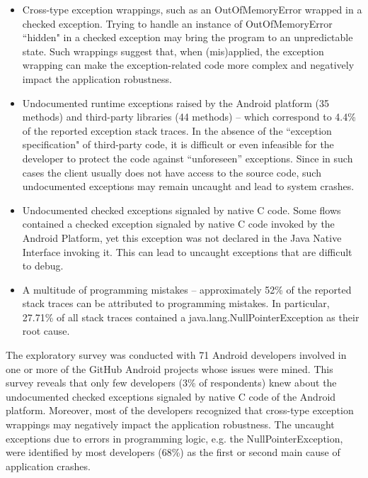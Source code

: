 \begin{itemize}

   \item  Cross-type exception wrappings, such as an OutOfMemoryError wrapped in a checked exception.
Trying to handle an instance of OutOfMemoryError ``hidden" in  a checked exception may bring the program
 to an unpredictable state. Such wrappings suggest that, when (mis)applied, the exception wrapping can make
the exception-related code more complex and negatively impact the application robustness.

  \item  Undocumented runtime exceptions raised by the Android platform (35 methods) and  third-party libraries (44 methods) --
 which correspond to 4.4\% of the reported exception stack traces.
In the absence of the ``exception specification" of third-party code, it is difficult or
even infeasible for the developer to protect the code against ``unforeseen'' exceptions.
Since in such cases the client usually does not have access to the source code, such undocumented
exceptions may remain uncaught and lead to system crashes.

   \item Undocumented checked exceptions signaled by native C code.  Some flows contained a checked
exception signaled by native C code invoked by the Android Platform, yet this exception was not declared
 in the Java Native Interface invoking it. This can lead to uncaught exceptions that are
difficult to debug.

 \item A multitude of programming mistakes -- approximately 52\% of the reported stack traces can
be attributed to programming mistakes. In particular, 27.71\% of all stack traces contained a java.lang.NullPointerException
as their root cause.

\end{itemize}

The exploratory survey was conducted with 71 Android developers involved in one or more of the
GitHub Android projects whose issues were mined. This survey reveals that only few developers (3\% of respondents)
 knew about the undocumented checked exceptions signaled by native C code of the Android platform.
Moreover, most of the developers recognized that cross-type exception wrappings may
negatively impact the application robustness. The uncaught exceptions due to errors in programming
logic, e.g. the NullPointerException, were identified by most developers (68\%) as the first or second main cause
of application crashes.

